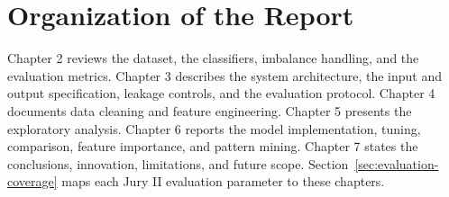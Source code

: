 \section{Organization of the Report}
Chapter 2 reviews the dataset, the classifiers, imbalance handling, and the evaluation metrics. Chapter 3 describes the system architecture, the input and output specification, leakage controls, and the evaluation protocol. Chapter 4 documents data cleaning and feature engineering. Chapter 5 presents the exploratory analysis. Chapter 6 reports the model implementation, tuning, comparison, feature importance, and pattern mining. Chapter 7 states the conclusions, innovation, limitations, and future scope. Section~\ref{sec:evaluation-coverage} maps each Jury II evaluation parameter to these chapters.

